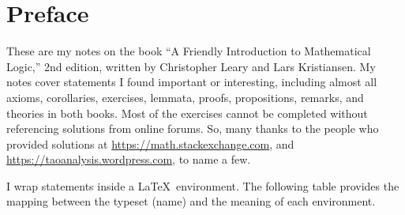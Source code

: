 \chapter*{Preface}

These are my notes on the book ``A Friendly Introduction to Mathematical Logic,'' 2nd edition, written by Christopher Leary and Lars Kristiansen.
My notes cover statements I found important or interesting, including almost all axioms, corollaries, exercises, lemmata, proofs, propositions, remarks, and theories in both books.
Most of the exercises cannot be completed without referencing solutions from online forums.
So, many thanks to the people who provided solutions at \url{https://math.stackexchange.com}, and \url{https://taoanalysis.wordpress.com}, to name a few.

I wrap statements inside a \LaTeX\ environment.
The following table provides the mapping between the typeset (name) and the meaning of each environment.
